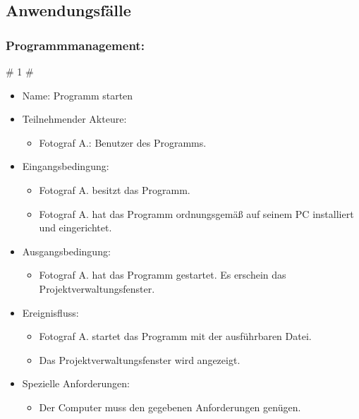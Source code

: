 \subsection{Anwendungsfälle}

	\subsubsection{Programmmanagement:}
	\# 1 \#
	\begin{itemize}
		\item Name: Programm starten
		\item Teilnehmender Akteure:
		\begin{itemize}
			\item	Fotograf A.: Benutzer des Programms.
		\end{itemize}
		\item Eingangsbedingung:
		\begin{itemize}
			\item Fotograf A. besitzt das Programm.
			\item Fotograf A. hat das Programm ordnungsgemäß auf seinem PC installiert und eingerichtet.						
		\end{itemize}
		\item Ausgangsbedingung:
		\begin{itemize}
			\item	Fotograf A. hat das Programm gestartet. Es erschein das Projektverwaltungsfenster.		
		\end{itemize}
		\item Ereignisfluss:	
		\begin{itemize}
			\item Fotograf A. startet das Programm mit der ausführbaren Datei.		
			\item Das Projektverwaltungsfenster wird angezeigt.
		\end{itemize}
		\item Spezielle Anforderungen:
		\begin{itemize}
			\item	Der Computer muss den gegebenen Anforderungen genügen.
		\end{itemize}
	\end{itemize}
	
